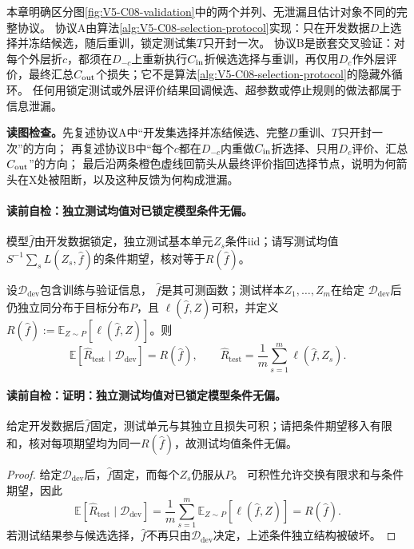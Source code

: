 本章明确区分图\ref{fig:V5-C08-validation}中的两个并列、无泄漏且估计对象不同的完整协议。
协议A由算法\ref{alg:V5-C08-selection-protocol}实现：只在开发数据$D$上选择并冻结候选，随后重训，锁定测试集$T$只开封一次。
协议B是嵌套交叉验证：对每个外层折$c$，都须在$D_{-c}$上重新执行$C_{\rm in}$折候选选择与重训，再仅用$D_c$作外层评价，最终汇总$C_{\rm out}$个损失；它不是算法\ref{alg:V5-C08-selection-protocol}的隐藏外循环。
任何用锁定测试或外层评价结果回调候选、超参数或停止规则的做法都属于信息泄漏。

\FloatBarrier
\noindent\textbf{读图检查。}先复述协议A中“开发集选择并冻结候选、完整$D$重训、$T$只开封一次”的方向；
再复述协议B中“每个$c$都在$D_{-c}$内重做$C_{\rm in}$折选择、只用$D_c$评价、汇总$C_{\rm out}$”的方向；
最后沿两条橙色虚线回箭头从最终评价指回选择节点，说明为何箭头在X处被阻断，以及这种反馈为何构成泄漏。

\paragraph{读前自检：独立测试均值对已锁定模型条件无偏。}模型$\widehat f$由开发数据锁定，独立测试基本单元$Z_s$条件iid；请写测试均值$S^{-1}\sum_sL(Z_s,\widehat f)$的条件期望，核对等于$R(\widehat f)$。\par

\begin{proposition}[独立测试均值对已锁定模型条件无偏]\label{prop:V5-C08-test-unbiased}
设$\mathcal D_{\mathrm{dev}}$包含训练与验证信息，
$\widehat f$是其可测函数；测试样本$Z_1,\ldots,Z_m$在给定
$\mathcal D_{\mathrm{dev}}$后仍独立同分布于目标分布$P$，且
$\ell(\widehat f,Z)$可积，并定义
$R(\widehat f):=\mathbb E_{Z\sim P}[\ell(\widehat f,Z)]$。则
\[
\mathbb E\!\left[\widehat R_{\mathrm{test}}\mid\mathcal D_{\mathrm{dev}}\right]
=R(\widehat f),\qquad
\widehat R_{\mathrm{test}}=\frac1m\sum_{s=1}^m\ell(\widehat f,Z_s).
\]
\end{proposition}
\paragraph{读前自检：证明：独立测试均值对已锁定模型条件无偏。}给定开发数据后$\widehat f$固定，测试单元与其独立且损失可积；请把条件期望移入有限和，核对每项期望均为同一$R(\widehat f)$，故测试均值条件无偏。\par

\begin{proof}
给定$\mathcal D_{\mathrm{dev}}$后，$\widehat f$固定，而每个$Z_s$仍服从$P$。
可积性允许交换有限求和与条件期望，因此
\[
\mathbb E[\widehat R_{\mathrm{test}}\mid\mathcal D_{\mathrm{dev}}]
=\frac1m\sum_{s=1}^m
\mathbb E_{Z\sim P}[\ell(\widehat f,Z)]
=R(\widehat f).
\]
若测试结果参与候选选择，$\widehat f$不再只由$\mathcal D_{\mathrm{dev}}$决定，上述条件独立结构被破坏。
\end{proof}

